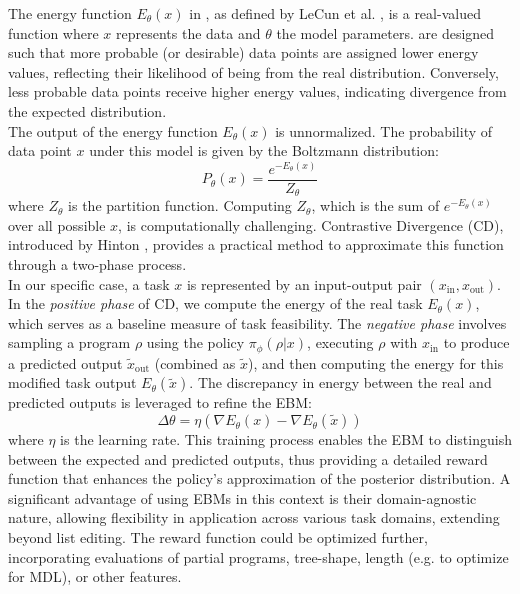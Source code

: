 The energy function \( E_\theta(x) \) in , as defined by LeCun et al. \cite{lecunTutorialEnergyBasedLearning}, is a real-valued function where \( x \) represents the data and \( \theta \) the model parameters.  are designed such that more probable (or desirable) data points are assigned lower energy values, reflecting their likelihood of being from the real distribution. Conversely, less probable data points receive higher energy values, indicating divergence from the expected distribution. \\
The output of the energy function \( E_\theta(x) \) is unnormalized. The probability of data point \( x \) under this model is given by the Boltzmann distribution:
\begin{equation}
    P_\theta(x) = \frac{e^{-E_\theta(x)}}{Z_\theta}
\end{equation}
where \( Z_\theta \) is the partition function. Computing \( Z_\theta \), which is the sum of \( e^{-E_\theta(x)} \) over all possible \( x \), is computationally challenging. Contrastive Divergence (CD), introduced by Hinton \cite{hinton2002training}, provides a practical method to approximate this function through a two-phase process. \\
In our specific case, a task \( x \) is represented by an input-output pair \((x_{\text{in}}, x_{\text{out}})\). In the \emph{positive phase} of CD, we compute the energy of the real task \( E_\theta(x) \), which serves as a baseline measure of task feasibility. The \emph{negative phase} involves sampling a program \( \rho \) using the policy \( \pi_\phi(\rho | x) \), executing \( \rho \) with \( x_{\text{in}} \) to produce a predicted output \( \tilde{x}_{\text{out}} \) (combined as \( \tilde{x} \)), and then computing the energy for this modified task output \( E_\theta(\tilde{x}) \). The discrepancy in energy between the real and predicted outputs is leveraged to refine the EBM:
\begin{equation}    
    \Delta\theta = \eta (\nabla E_\theta(x) - \nabla E_\theta(\tilde{x})) 
\end{equation}
where \( \eta \) is the learning rate. This training process enables the EBM to distinguish between the expected and predicted outputs, thus providing a detailed reward function that enhances the policy's approximation of the posterior distribution.
A significant advantage of using EBMs in this context is their domain-agnostic nature, allowing flexibility in application across various task domains, extending beyond list editing.
The reward function could be optimized further, incorporating evaluations of partial programs, tree-shape, length (e.g. to optimize for MDL), or other features.

